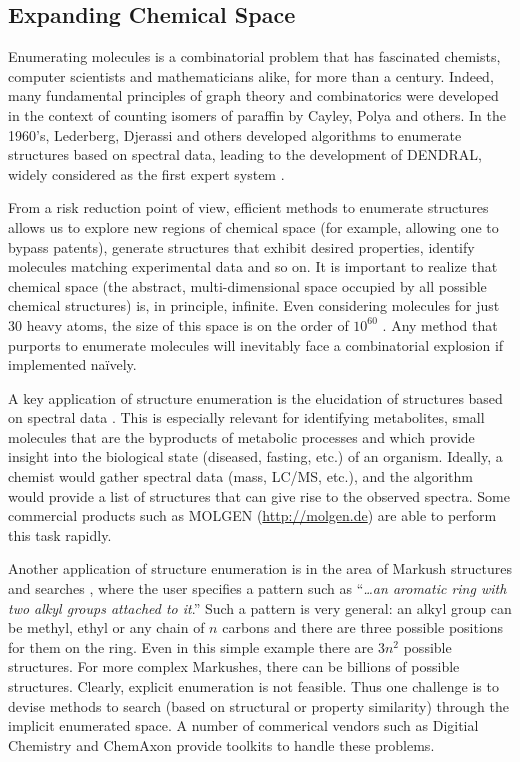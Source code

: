 \documentclass{sig-alternate}
\begin{document}
\subsection{Expanding Chemical Space}
\label{sec:struct-enum}
Enumerating molecules is a combinatorial problem that has fascinated
chemists, computer scientists and mathematicians alike, for more than
a century. Indeed, many fundamental principles of graph theory and
combinatorics were developed in the context of counting isomers of
paraffin by Cayley, Polya and others. In the 1960's, Lederberg, 
Djerassi and others developed algorithms to enumerate structures
based on spectral data, leading to the development of DENDRAL, widely
considered as the first expert system \cite{DENDRAL}.

From a risk reduction point of view, efficient methods to enumerate
structures allows us to explore new regions of chemical space (for
example, allowing one to bypass patents), generate structures that
exhibit desired properties, identify molecules matching experimental
data and so on. It is important to realize that chemical space (the
abstract, multi-dimensional space occupied by all possible chemical
structures) is, in principle, infinite. Even considering molecules for
just 30 heavy atoms, the size of this space is on the order of
$10^{60}$ \cite{Bohacek:1996ve}. Any method that purports to enumerate
molecules will inevitably face a combinatorial explosion if
implemented na\"{i}vely.

A key application of structure enumeration is the elucidation of
structures based on spectral data \cite{Kind:2010zr}. This is
especially relevant for identifying metabolites, small molecules
that are the byproducts of metabolic processes and which provide
insight into the biological state (diseased, fasting, etc.) of an
organism. Ideally, a chemist would gather spectral data (mass, LC/MS, etc.),
and the algorithm would provide a list of structures that can give
rise to the observed spectra. Some commercial products such as MOLGEN
(\url{http://molgen.de}) are able to perform this task rapidly.

Another application of structure enumeration is in the area of Markush
structures and searches \cite{Barnard:1991vn}, where the user
specifies a pattern such as ``\emph{\ldots an aromatic ring with two
  alkyl groups attached to it}.'' Such a pattern is very general: an
alkyl group can be methyl, ethyl or any chain of $n$ carbons and there
are three possible positions for them on the ring. Even in this simple
example there are $3n^2$ possible structures. For more complex
Markushes, there can be billions of possible structures. Clearly,
explicit enumeration is not feasible. Thus one challenge is to devise
methods to search (based on structural or property similarity) through
the implicit enumerated space. A number of commerical vendors such as
Digitial Chemistry and ChemAxon provide toolkits to handle these
problems.
\end{document}
